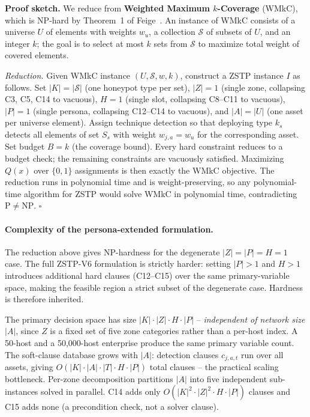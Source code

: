 \documentclass[10pt,twocolumn]{article}
\begin{document}
\smallskip\noindent\textbf{Proof sketch.}
We reduce from \textbf{Weighted Maximum $k$-Coverage} (WMkC), which is NP-hard by Theorem~1 of Feige~\cite{feige1998}. An instance of WMkC consists of a universe $U$ of elements with weights $w_u$, a collection $\mathcal{S}$ of subsets of $U$, and an integer $k$; the goal is to select at most $k$ sets from $\mathcal{S}$ to maximize total weight of covered elements.

\emph{Reduction.} Given WMkC instance $(U,\mathcal{S},w,k)$, construct a ZSTP instance $I$ as follows. Set $|K|=|\mathcal{S}|$ (one honeypot type per set), $|Z|=1$ (single zone, collapsing C3, C5, C14 to vacuous), $H=1$ (single slot, collapsing C8--C11 to vacuous), $|P|=1$ (single persona, collapsing C12--C14 to vacuous), and $|A|=|U|$ (one asset per universe element). Assign technique detection so that deploying type $k_s$ detects all elements of set $S_s$ with weight $w_{j,a}=w_u$ for the corresponding asset. Set budget $B=k$ (the coverage bound). Every hard constraint reduces to a budget check; the remaining constraints are vacuously satisfied. Maximizing $Q(x)$ over $\{0,1\}$ assignments is then exactly the WMkC objective. The reduction runs in polynomial time and is weight-preserving, so any polynomial-time algorithm for ZSTP would solve WMkC in polynomial time, contradicting $\mathrm{P}\neq\mathrm{NP}$.
\hfill$\square$\smallskip

\paragraph{Complexity of the persona-extended formulation.}
The reduction above gives NP-hardness for the degenerate $|Z|{=}|P|{=}H{=}1$ case. The full ZSTP-V6 formulation is strictly harder: setting $|P|{>}1$ and $H{>}1$ introduces additional hard clauses (C12--C15) over the same primary-variable space, making the feasible region a strict subset of the degenerate case. Hardness is therefore inherited.

The primary decision space has size $|K|{\cdot}|Z|{\cdot}H{\cdot}|P|$ -- \emph{independent of network size} $|A|$, since $Z$ is a fixed set of five zone categories rather than a per-host index. A 50-host and a 50,000-host enterprise produce the same primary variable count. The soft-clause database grows with $|A|$: detection clauses $c_{j,a,t}$ run over all assets, giving $O(|K|{\cdot}|A|{\cdot}|T|{\cdot}H{\cdot}|P|)$ total clauses -- the practical scaling bottleneck. Per-zone decomposition partitions $|A|$ into five independent sub-instances solved in parallel. C14 adds only $O(|K|^2{\cdot}|Z|^2{\cdot}H{\cdot}|P|)$ clauses and C15 adds none (a precondition check, not a solver clause).
\end{document}
